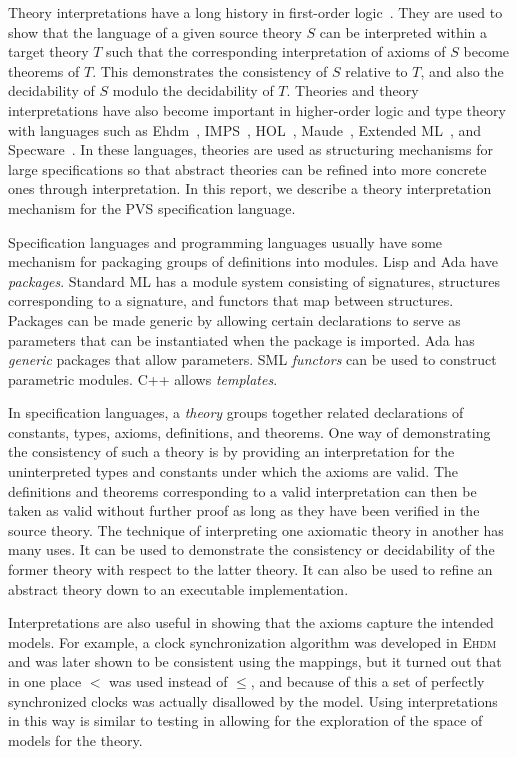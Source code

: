 \documentclass[11pt,twoside,openright,titlepage]{cslreport}
\newcommand{\specware}{{\sc Specware}}
\begin{document}
Theory interpretations have a long history in first-order
logic~\cite{Shoenfield,Enderton,Monk76}\@.  They are used to show that the
language of a given source theory $S$ can be interpreted within a target
theory $T$ such that the corresponding interpretation of axioms of $S$
become theorems of $T$\@.  This demonstrates the consistency of $S$
relative to $T$, and also the decidability of $S$ modulo the decidability
of $T$\@.  Theories and theory interpretations have also become important
in higher-order logic and type theory with languages such as {\sc
Ehdm}~\cite{EHDM:manuals}, IMPS~\cite{Farmer:interpretations},
HOL~\cite{Windley92}, Maude~\cite{Maude}, Extended
ML~\cite{SannellaDT:essential-concepts97}, and
\specware~\cite{SrinivasJullig95}\@.  In these languages, theories are
used as structuring mechanisms for large specifications so that abstract
theories can be refined into more concrete ones through interpretation.
In this report, we describe a theory interpretation mechanism for the PVS
specification language.

Specification languages and programming languages usually have some
mechanism for packaging groups of definitions into modules.  Lisp and Ada
have \emph{packages}\@.  Standard ML has a module system consisting of
signatures, structures corresponding to a signature, and functors that map
between structures.  Packages can be made generic by allowing certain
declarations to serve as parameters that can be instantiated when the
package is imported.  Ada has \emph{generic} packages that allow
parameters.  SML \emph{functors} can be used to construct parametric
modules.  C++ allows \emph{templates}.

In specification languages, a \emph{theory} groups together related
declarations of constants, types, axioms, definitions, and theorems.  One
way of demonstrating the consistency of such a theory is by providing an
interpretation for the uninterpreted types and constants under which the
axioms are valid.  The definitions and theorems corresponding to a valid
interpretation can then be taken as valid without further proof as long as
they have been verified in the source theory.  The technique of
interpreting one axiomatic theory in another has many uses.  It can be
used to demonstrate the consistency or decidability of the former theory
with respect to the latter theory.  It can also be used to refine an
abstract theory down to an executable implementation.

Interpretations are also useful in showing that the axioms capture the
intended models.  For example, a clock synchronization algorithm was
developed in \textsc{Ehdm} and was later shown to be consistent using the
mappings, but it turned out that in one place $<$ was used instead of
$\leq$, and because of this a set of perfectly synchronized clocks was
actually disallowed by the model.  Using interpretations in this way is
similar to testing in allowing for the exploration of the space of models
for the theory.
\end{document}
